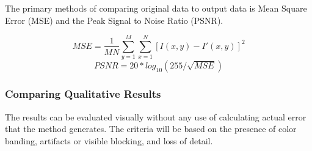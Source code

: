 \documentclass[12pt]{article}
\begin{document}
The primary methods of comparing original data to output data is Mean Square Error (MSE) and the Peak Signal to Noise Ratio (PSNR).

\[
MSE = \frac{1}{MN}\sum_{y=1}^{M}\sum_{x=1}^{N}[I(x,y)-I'(x,y)]^2
\]
\[
PSNR = 20*log_{10}(255/\sqrt{MSE})
\]

\subsubsection{Comparing Qualitative Results}
The results can be evaluated visually without any use of calculating actual error that the method generates. The criteria will be based on the presence of color banding, artifacts or visible blocking, and loss of detail.

\begin{figure}[!htbp]
\begin{center}

\end{center}
\end{figure}
\end{document}
